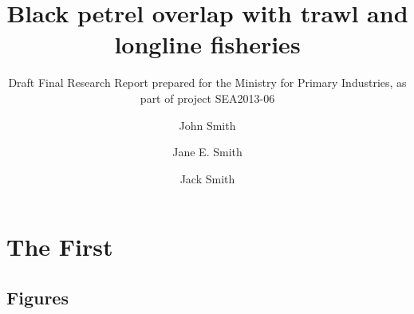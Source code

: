 \documentclass[draft]{dragonfly-report}
\title{Black petrel overlap with trawl and longline fisheries}{Overlap of the distribution of black petrel (\emph{Procellaria parkinsoni}) with  New Zealand trawl and longline fisheries}
\subtitle{Draft Final Research Report prepared for the Ministry for Primary Industries, as part of project SEA2013-06}
\author{John Smith \and Jane E. Smith \and Jack Smith}
\begin{document}
\maketitle


\tableofcontents



\section{The First}




\subsection{Figures}

\end{document}
